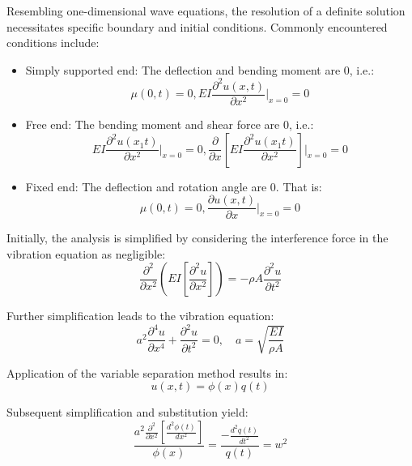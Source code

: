 \documentclass[conference]{IEEEtran}
\begin{document}
Resembling one-dimensional wave equations, the resolution of a definite solution necessitates specific boundary and initial conditions. Commonly encountered conditions include:

\begin{itemize}
    \item Simply supported end: The deflection and bending moment are 0, i.e.:
    \begin{equation}
    \mu{}(0,t) = 0, EI\frac{\partial^2 u(x, t)}{\partial x^2}\bigg|_{x=0} = 0
    \end{equation}
    
    \item Free end: The bending moment and shear force are 0, i.e.:
    \begin{equation}
    EI\frac{\partial^2 u(x_1t)}{\partial x^2}\bigg|_{x=0} = 0, \frac{\partial}{\partial x}\left[EI\frac{\partial^2 u(x_1t)}{\partial x^2}\right]\bigg|_{x=0} = 0
    \end{equation}
    
    \item Fixed end: The deflection and rotation angle are 0. That is:
    \begin{equation}
    \mu{}(0,t) = 0, \frac{\partial u(x, t)}{\partial x}\bigg|_{x=0} = 0
    \end{equation}
\end{itemize}

Initially, the analysis is simplified by considering the interference force in the vibration equation as negligible:
\begin{equation}
\frac{\partial^2}{\partial x^2} \left( EI \left[ \frac{\partial^2 u}{\partial x^2} \right] \right) = -\rho A \frac{\partial^2 u}{\partial t^2}
\end{equation}

Further simplification leads to the vibration equation:
\begin{equation}
a^2\frac{\partial^4 u}{\partial x^4} + \frac{\partial^2 u}{\partial t^2} = 0, \quad a = \sqrt{\frac{EI}{\rho A}}
\end{equation}

Application of the variable separation method results in:
\begin{equation}
u(x, t) = \phi(x) q(t)
\end{equation}

Subsequent simplification and substitution yield:
\begin{equation}
\frac{a^2 \frac{\partial^2}{\partial x^2} \left[ \frac{d^2 \phi (t)}{dx^2} \right]}{\phi (x)} = \frac{- \frac{d^2 q(t)}{dt^2}}{q (t)} = w^2
\end{equation}
\end{document}
